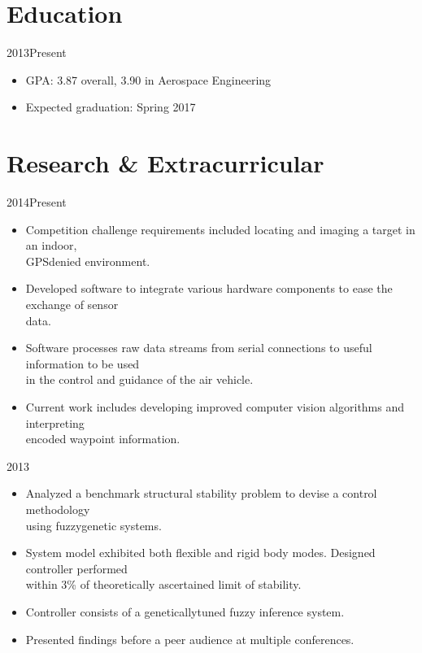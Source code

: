 \documentclass[letterpaper,10pt]{resume}
\author{Nicklas O. Stockton}
\begin{document}
	\maketitle
	\section{Education}
	{2013\textendash Present}
	
	\begin{itemize}
		\item GPA: 3.87 overall, 3.90 in Aerospace Engineering
		\item Expected graduation: Spring 2017
	\end{itemize}

	\section{Research \& Extracurricular}
	{2014\textendash Present}
	\begin{itemize}
		\item Competition challenge requirements included locating and imaging a target in an indoor,\\ GPS\textendash denied environment.
		\item Developed software to integrate various hardware components to ease the exchange of sensor\\ data.
		\item Software processes raw data streams from serial connections to useful information to be used\\ in the control and guidance of the air vehicle.
		\item Current work includes developing improved computer vision algorithms and interpreting\\ encoded waypoint information.
	\end{itemize}
	
	{2013}
	\begin{itemize}
		\item Analyzed a benchmark structural stability problem to devise a control methodology\\  using fuzzy\textendash genetic systems.
		\item System model exhibited both flexible and rigid body modes. Designed controller performed\\ within 3\% of theoretically ascertained limit of stability.
		\item Controller consists of a genetically\textendash tuned fuzzy inference system.
		\item Presented findings before a peer audience at multiple conferences.
	\end{itemize}	
	\pagebreak
	
\end{document}
